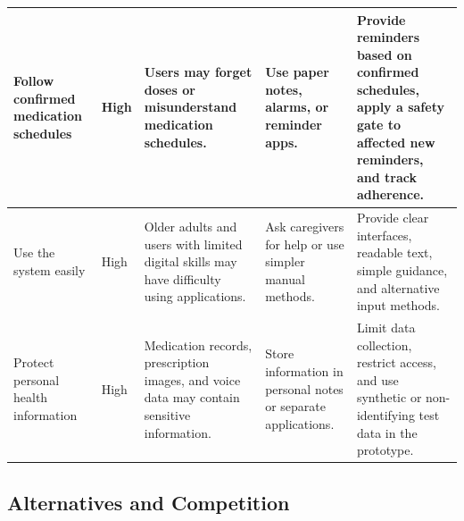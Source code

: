 \begin{longtable}{|L{0.21\textwidth}|L{0.09\textwidth}|L{0.20\textwidth}|L{0.20\textwidth}|L{0.20\textwidth}|}
Follow confirmed medication schedules
& High
& Users may forget doses or misunderstand
medication schedules.
& Use paper notes, alarms, or reminder apps.
& Provide reminders based on confirmed
schedules, apply a safety gate to affected
new reminders, and track adherence.
\\ \hline

Use the system easily
& High
& Older adults and users with limited digital
skills may have difficulty using applications.
& Ask caregivers for help or use
simpler manual methods.
& Provide clear interfaces, readable text,
simple guidance, and alternative input methods.
\\ \hline

Protect personal health information
& High
& Medication records, prescription images,
and voice data may contain sensitive information.
& Store information in personal notes
or separate applications.
& Limit data collection, restrict access,
and use synthetic or non-identifying
test data in the prototype.
\\ \hline

\end{longtable}


\subsection{Alternatives and Competition}

